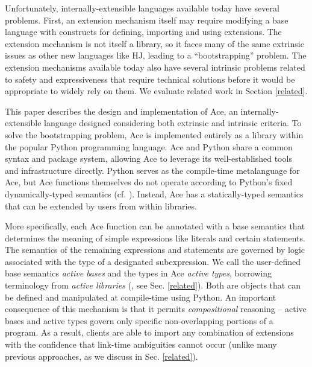 \documentclass[9pt,preprint]{sigplanconf}
\begin{document}

Unfortunately, internally-extensible languages available today have several problems. First, an extension mechanism itself may require modifying a base language with constructs for defining, importing and using extensions. The extension mechanism is not itself a library, so it faces many of the same extrinsic issues as other new languages like HJ, leading to a ``bootstrapping'' problem. The extension mechanisms available today also have several intrinsic problems related to safety and expressiveness that require technical solutions before it would be appropriate to widely rely on them. We evaluate related work in Section \ref{related}.

This paper describes the design and implementation of Ace, an internally-extensible language designed considering both extrinsic and intrinsic criteria. To solve the bootstrapping problem, Ace is implemented entirely as a library within the popular Python programming language. Ace and Python share a common syntax and package system, allowing Ace to leverage its well-established tools and infrastructure directly. Python serves as the compile-time metalanguage for Ace, but Ace functions themselves do not operate according to Python's fixed dynamically-typed semantics  (cf. \cite{Politz:2013:PFM:2509136.2509536,python}). Instead, Ace has a statically-typed semantics that can be extended by users from within libraries. 

More specifically, each Ace function can be annotated with a base semantics that determines the meaning of simple expressions like literals and certain statements. The semantics of the remaining expressions and statements are governed by logic associated with the type of a designated subexpression. We call the user-defined base semantics \emph{active bases} and the types in Ace \emph{active types}, borrowing terminology from \emph{active libraries} (\cite{activelibraries}, see Sec. \ref{related}). Both are objects that can be defined and manipulated at compile-time using Python. An important consequence of this mechanism is that it permits \emph{compositional} reasoning -- active bases and active types govern only specific non-overlapping portions of a program. As a result, clients are able to import any combination of extensions with the confidence that link-time ambiguities cannot occur (unlike many previous approaches, as we discuss in Sec. \ref{related}).
\end{document}
